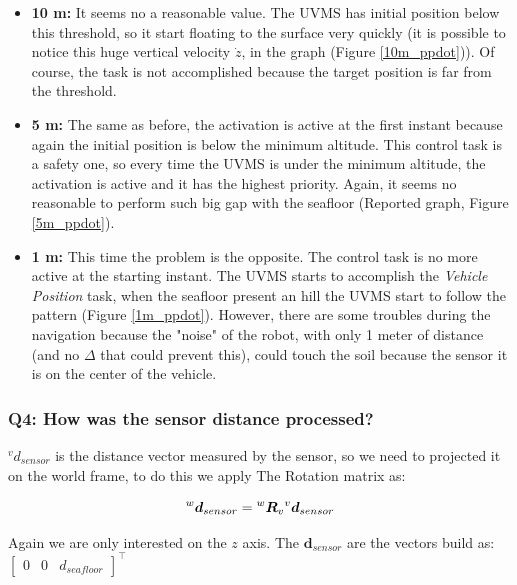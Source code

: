 \documentclass{article}
\begin{document}
\begin{itemize}
    \item \textbf{10 m:} It seems no a reasonable value. The UVMS has initial position below this threshold, so it start floating to the surface very quickly (it is possible to notice this huge vertical velocity $\dot{z}$, in the graph (Figure \ref{10m_ppdot})). Of course, the task is not accomplished because the target position is far from the threshold.
    \item \textbf{5 m:} The same as before, the activation is active at the first instant because again the initial position is below the minimum altitude. This control task is a safety one, so every time the UVMS is under the minimum altitude, the activation is active and it has the highest priority. Again, it seems no reasonable to perform such big gap with the seafloor (Reported graph, Figure \ref{5m_ppdot}).
    \item \textbf{1 m:} This time the problem is the opposite. The control task is no more active at the starting instant. The UVMS starts to accomplish the \textit{Vehicle Position} task, when the seafloor present an hill the UVMS start to follow the pattern (Figure \ref{1m_ppdot}). However, there are some troubles during the navigation because the "noise" of the robot, with only 1 meter of distance (and no $\Delta$ that could prevent this), could touch the soil because the sensor it is on the center of the vehicle.
\end{itemize}

\subsubsection{Q4: How was the sensor distance processed?}
 
 ${^{v}d_{sensor}}$ is the distance vector measured by the sensor, so we need to projected it on the world frame, to do this we apply The Rotation matrix as:
 
 \begin{equation}
 \large
     {^{w}\boldsymbol{d}_{sensor}} = {^{w}\boldsymbol{R}_{v}} {^{v}\boldsymbol{d}_{sensor}}
 \end{equation}
 
 \noindent
 Again we are only interested on the $z$ axis. The $\boldsymbol{d}_{sensor}$ are the vectors build as:
 $\begin{bmatrix}0 & 0 & d_{seafloor} \end{bmatrix}^\top$
\\ 
\end{document}
